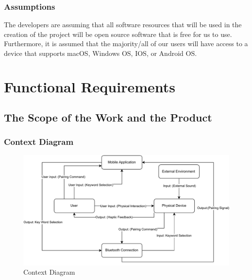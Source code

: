 \documentclass[12pt]{article}
\begin{document}
\subsubsection{Assumptions}
The developers are assuming that all software resources that will be used in the 
creation of the project will be open source software that is free for us to use. 
Furthermore, it is assumed that the majority/all of our users will have access to 
a device that supports macOS, Windows OS, IOS, or Android OS.

\section{Functional Requirements}
\subsection{The Scope of the Work and the Product}
\subsubsection{Context Diagram}

\begin{figure}[H]
  \begin{center}
    \includegraphics{WC.pdf}
  \caption{Context Diagram}
  \label{ContextDiagram} 
  \end{center}
\end{figure}
\end{document}
